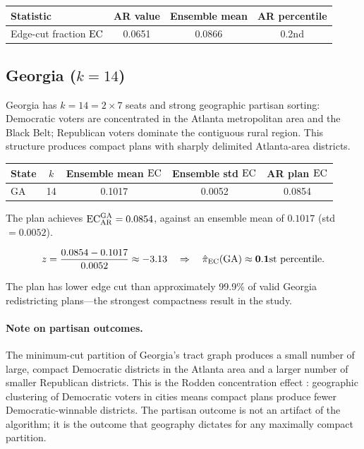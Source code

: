 \begin{center}
\begin{tabular}{lccc}
\toprule
Statistic & AR value & Ensemble mean & AR percentile \\
\midrule
Edge-cut fraction $\mathrm{EC}$ & 0.0651 & 0.0866 & 0.2nd \\
\bottomrule
\end{tabular}
\end{center}

\subsection{Georgia ($k = 14$)}

Georgia has $k = 14 = 2 \times 7$ seats and strong geographic partisan sorting:
Democratic voters are concentrated in the Atlanta metropolitan area and the
Black Belt; Republican voters dominate the contiguous rural region.  This
structure produces compact plans with sharply delimited Atlanta-area districts.

\begin{center}
\begin{tabular}{lcccc}
\toprule
State & $k$ & Ensemble mean $\mathrm{EC}$ & Ensemble std $\mathrm{EC}$ & AR plan $\mathrm{EC}$ \\
\midrule
GA & 14 & 0.1017 & 0.0052 & 0.0854 \\
\bottomrule
\end{tabular}
\end{center}

The \ar{} plan achieves $\mathrm{EC}_{\mathrm{AR}}^{\mathrm{GA}} = 0.0854$, against
an ensemble mean of $0.1017$ (std $= 0.0052$).

\begin{equation}
  z = \frac{0.0854 - 0.1017}{0.0052} \approx -3.13 \quad\Rightarrow\quad
  \hat\pi_{\mathrm{EC}}(\mathrm{GA}) \approx \mathbf{0.1\text{st percentile}}.
\end{equation}

The \ar{} plan has lower edge cut than approximately 99.9\% of valid Georgia
redistricting plans---the strongest compactness result in the study.

\paragraph{Note on partisan outcomes.}
The minimum-cut partition of Georgia's tract graph produces a small number of
large, compact Democratic districts in the Atlanta area and a larger number of
smaller Republican districts.  This is the Rodden concentration effect
\citep{rodden2019why}: geographic clustering of Democratic voters in cities
means compact plans produce fewer Democratic-winnable districts.  The partisan
outcome is not an artifact of the algorithm; it is the outcome that geography
dictates for any maximally compact partition.

